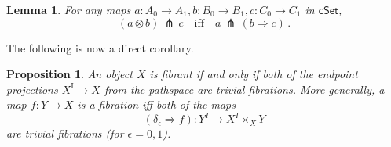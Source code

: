 \documentclass[11pt]{amsart}
\newcommand{\cSet}{\ensuremath{\mathsf{cSet}}}
\newcommand{\mono}{\ensuremath{\rightarrowtail}}
\newcommand{\ra}{\ensuremath{\rightarrow}}
\renewcommand{\to}{\ensuremath{\rightarrow}}
\newcommand{\I}{\ensuremath{\mathrm{I}}}
\newtheorem{proposition}[theorem]{Proposition}
\newtheorem{lemma}[theorem]{Lemma}
\theoremstyle{remark}
\theoremstyle{definition}
\begin{document}
\begin{lemma}\label{lemma:Leibniz}
For any maps $a : A_0 \to A_1, b : B_0 \to B_1, c : C_0 \to C_1$ in $\cSet$,
\[
(a\otimes b)\, \pitchfork\, c\quad\text{iff}\quad a\, \pitchfork\, (b\Rightarrow\! c)\,.
\]
\end{lemma}

The following is now a direct corollary.

\begin{proposition}\label{prop:algequivfill}
An object $X$ is fibrant if and only if both of the endpoint  projections $X^\I \ra X$ from the pathspace are trivial fibrations. More generally, a map $f : Y\ra X$ is a fibration iff both of the maps $$(\delta_\epsilon \Rightarrow f) : Y^I \ra X^I\times_X Y$$ are trivial fibrations (for $\epsilon = 0,1$).
\end{proposition}
%
\end{document}
